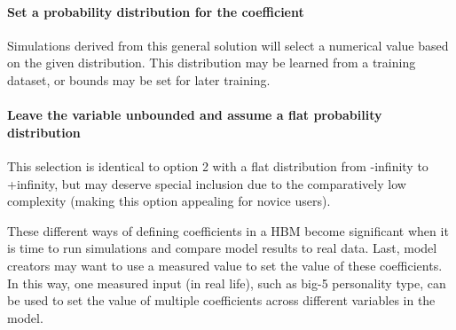\documentclass[conference]{IEEEtran}
\begin{document}
\paragraph{Set a probability distribution for the coefficient}
Simulations derived from this general solution will select a numerical value based on the given distribution. 
This distribution may be learned from a training dataset, or bounds may be set for later training. 

\paragraph{Leave the variable unbounded and assume a flat probability distribution}
This selection is identical to option 2 with a flat distribution from -infinity to +infinity, but may deserve special inclusion due to the comparatively low complexity (making this option appealing for novice users).

These different ways of defining coefficients in a HBM become significant when it is time to run simulations and compare model results to real data. 
Last, model creators may want to use a measured value to set the value of these coefficients. In this way, one measured input (in real life), such as big-5 personality type, can be used to set the value of multiple coefficients across different variables in the model.

% 
\end{document}
